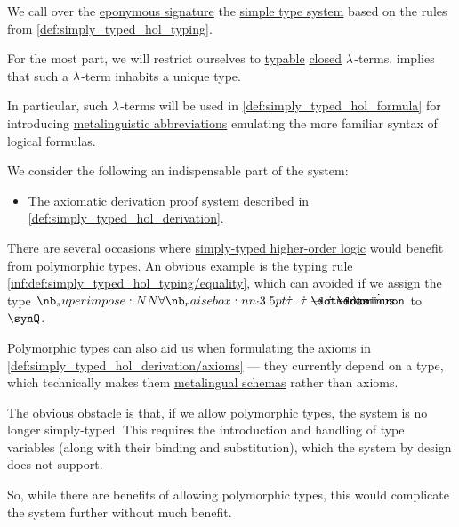 \begin{definition}\label{def:simply_typed_hol}
  We call  over the \hyperref[def:simply_typed_hol_signature]{eponymous signature} the \hyperref[def:simple_type_system]{simple type system} based on the rules from \cref{def:simply_typed_hol_typing}.

  For the most part, we will restrict ourselves to \hyperref[def:typability]{typable} \hyperref[def:lambda_combinator]{closed} \( {\mathrm \lambda} \)-terms.  implies that such a \( {\mathrm \lambda} \)-term inhabits a unique type.

  In particular, such \( {\mathrm \lambda} \)-terms will be used in \cref{def:simply_typed_hol_formula} for introducing \hyperref[con:metalingual_abbreviation]{metalinguistic abbreviations} emulating the more familiar syntax of logical formulas.
\end{definition}
\begin{comments}
  \item We consider the following an indispensable part of the system:
  \begin{itemize}
    \item The axiomatic derivation proof system described in \cref{def:simply_typed_hol_derivation}.
  \end{itemize}
\end{comments}

\begin{remark}\label{rem:simply_typed_hol_polymorphic_types}
  There are several occasions where \hyperref[def:simply_typed_hol]{simply-typed higher-order logic} would benefit from \hyperref[def:polymorphic_typed_lambda_calculus]{polymorphic types}. An obvious example is the typing rule \ref{inf:def:simply_typed_hol_typing/equality}, which can avoided if we assign the type \( \qpolytype {\syn\tau} \syn\tau \synimplies \syn\tau \synimplies \syn\omicron \) to \( \synQ \).

  Polymorphic types can also aid us when formulating the axioms in \ref{def:simply_typed_hol_derivation/axioms} --- they currently depend on a type, which technically makes them \hyperref[con:schemas_and_instances]{metalingual schemas} rather than axioms.

  The obvious obstacle is that, if we allow polymorphic types, the system is no longer simply-typed. This requires the introduction and handling of type variables (along with their binding and substitution), which the system by design does not support.

  So, while there are benefits of allowing polymorphic types, this would complicate the system further without much benefit.
\end{remark}

